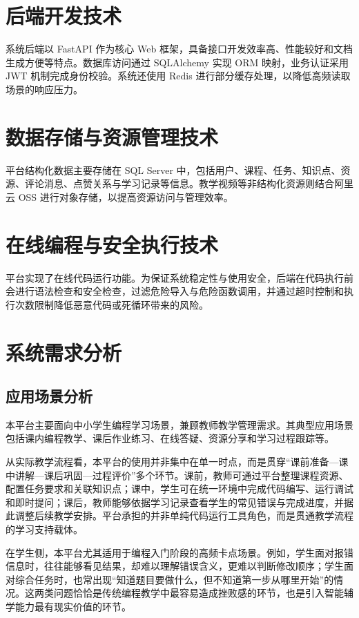 \section{后端开发技术}
系统后端以 FastAPI 作为核心 Web 框架，具备接口开发效率高、性能较好和文档生成方便等特点。数据库访问通过 SQLAlchemy 实现 ORM 映射，业务认证采用 JWT 机制完成身份校验。系统还使用 Redis 进行部分缓存处理，以降低高频读取场景的响应压力。

\section{数据存储与资源管理技术}
平台结构化数据主要存储在 SQL Server 中，包括用户、课程、任务、知识点、资源、评论消息、点赞关系与学习记录等信息。教学视频等非结构化资源则结合阿里云 OSS 进行对象存储，以提高资源访问与管理效率。

\section{在线编程与安全执行技术}
平台实现了在线代码运行功能。为保证系统稳定性与使用安全，后端在代码执行前会进行语法检查和安全检查，过滤危险导入与危险函数调用，并通过超时控制和执行次数限制降低恶意代码或死循环带来的风险。

\section{系统需求分析}
\subsection{应用场景分析}
本平台主要面向中小学生编程学习场景，兼顾教师教学管理需求。其典型应用场景包括课内编程教学、课后作业练习、在线答疑、资源分享和学习过程跟踪等。

从实际教学流程看，本平台的使用并非集中在单一时点，而是贯穿“课前准备—课中讲解—课后巩固—过程评价”多个环节。课前，教师可通过平台整理课程资源、配置任务要求和关联知识点；课中，学生可在统一环境中完成代码编写、运行调试和即时提问；课后，教师能够依据学习记录查看学生的常见错误与完成进度，并据此调整后续教学安排。平台承担的并非单纯代码运行工具角色，而是贯通教学流程的学习支持载体。

在学生侧，本平台尤其适用于编程入门阶段的高频卡点场景。例如，学生面对报错信息时，往往能够看见结果，却难以理解错误含义，更难以判断修改顺序；学生面对综合任务时，也常出现“知道题目要做什么，但不知道第一步从哪里开始”的情况。这两类问题恰恰是传统编程教学中最容易造成挫败感的环节，也是引入智能辅学能力最有现实价值的环节。

